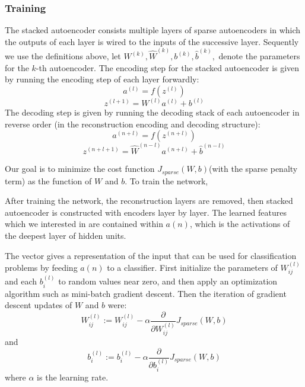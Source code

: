 \documentclass[journal]{IEEEtran}
\begin{document}
\subsubsection{Training}
The stacked autoencoder consists multiple layers of sparse autoencoders in which the outputs of each layer is wired to the inputs of the successive layer. Sequently we use the definitions above, let $W^{(k)}, \hat{W}^{(k)}, b^{(k)}, \hat{b}^{(k)},$ denote the parameters for the $k$-th autoencoder. The encoding step for the stacked autoencoder is given by running the encoding step of each layer forwardly:
\begin{equation}
a^{(l)} = f(z^{(l)})
\end{equation}
\begin{equation}
z^{(l+1)} = W^{(l)}a^{(l)} + b^{(l)}
\end{equation}
The decoding step is given by running the decoding stack of each autoencoder in reverse order (in the reconstruction encoding and decoding structure):
\begin{equation}
a^{(n + l)} = f(z^{(n + l)}) 
\end{equation}
\begin{equation}
z^{(n + l + 1)} = \hat{W}^{(n - l)}a^{(n + l)} + \hat{b}^{(n - l)}
\end{equation}

Our goal is to minimize the cost function $J_{sparse}(W, b)$(with the sparse penalty term) as the function of $W$ and $b$. To train the network, 

After training the network, the reconstruction layers are removed, then stacked autoencoder is constructed with encoders layer by layer. The learned features which we interested in are contained within $a(n)$, which is the activations of the deepest layer of hidden units. 


The vector gives a representation of the input that can be used for classification problems by feeding $a(n)$ to a classifier. First initialize the parameters of $W^{(l)}_{ij}$ and each $b^{(l)}_i$ to random values near zero, and then apply an optimization algorithm such as mini-batch gradient descent. Then the iteration of gradient descent updates of $W$ and $b$ were:
\begin{equation}
W_{ij}^{(l)}  := W_{ij}^{(l)} - \alpha \frac{\partial}{\partial W_{ij}^{(l)}} J_{sparse}(W,b) 
\end{equation}
and
\begin{equation}
b_{i}^{(l)}  := b_{i}^{(l)} - \alpha \frac{\partial}{\partial b_{i}^{(l)}} J_{sparse}(W,b)
\end{equation}
where $\alpha$ is the learning rate.
\end{document}
